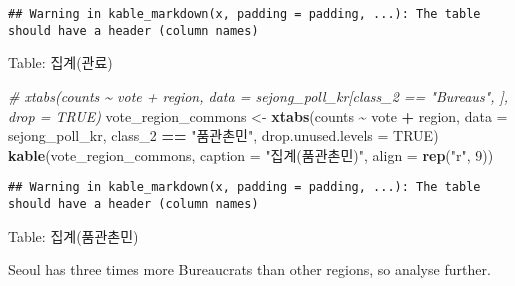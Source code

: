 \documentclass[
]{article}
\newenvironment{Shaded}{\begin{snugshade}}{\end{snugshade}}
\newcommand{\CommentTok}[1]{\textcolor[rgb]{0.56,0.35,0.01}{\textit{#1}}}
\newcommand{\DataTypeTok}[1]{\textcolor[rgb]{0.13,0.29,0.53}{#1}}
\newcommand{\DecValTok}[1]{\textcolor[rgb]{0.00,0.00,0.81}{#1}}
\newcommand{\KeywordTok}[1]{\textcolor[rgb]{0.13,0.29,0.53}{\textbf{#1}}}
\newcommand{\NormalTok}[1]{#1}
\newcommand{\OperatorTok}[1]{\textcolor[rgb]{0.81,0.36,0.00}{\textbf{#1}}}
\newcommand{\OtherTok}[1]{\textcolor[rgb]{0.56,0.35,0.01}{#1}}
\newcommand{\StringTok}[1]{\textcolor[rgb]{0.31,0.60,0.02}{#1}}
\begin{document}
\begin{verbatim}
## Warning in kable_markdown(x, padding = padding, ...): The table should have a header (column names)
\end{verbatim}

Table: 집계(관료)

\textbar\textbar{} \textbar\textbar{} \textbar\textbar{}
\textbar\textbar{}

\begin{Shaded}
\begin{Highlighting}[]
\CommentTok{\# xtabs(counts \textasciitilde{} vote + region, data = sejong\_poll\_kr[class\_2 == "Bureaus", ], drop = TRUE)}
\NormalTok{vote\_region\_commons \textless{}{-}}\StringTok{ }\KeywordTok{xtabs}\NormalTok{(counts }\OperatorTok{\textasciitilde{}}\StringTok{ }\NormalTok{vote }\OperatorTok{+}\StringTok{ }\NormalTok{region, }
                             \DataTypeTok{data =}\NormalTok{ sejong\_poll\_kr, }
\NormalTok{                             class\_}\DecValTok{2} \OperatorTok{==}\StringTok{ "품관촌민"}\NormalTok{, }
                             \DataTypeTok{drop.unused.levels =} \OtherTok{TRUE}\NormalTok{)}
\KeywordTok{kable}\NormalTok{(vote\_region\_commons, }
      \DataTypeTok{caption =} \StringTok{"집계(품관촌민)"}\NormalTok{, }
      \DataTypeTok{align =} \KeywordTok{rep}\NormalTok{(}\StringTok{"r"}\NormalTok{, }\DecValTok{9}\NormalTok{))}
\end{Highlighting}
\end{Shaded}

\begin{verbatim}
## Warning in kable_markdown(x, padding = padding, ...): The table should have a header (column names)
\end{verbatim}

Table: 집계(품관촌민)

\textbar\textbar{} \textbar\textbar{} \textbar\textbar{}
\textbar\textbar{}

Seoul has three times more Bureaucrats than other regions, so analyse
further.

\begin{Shaded}
\end{Shaded}
\end{document}
